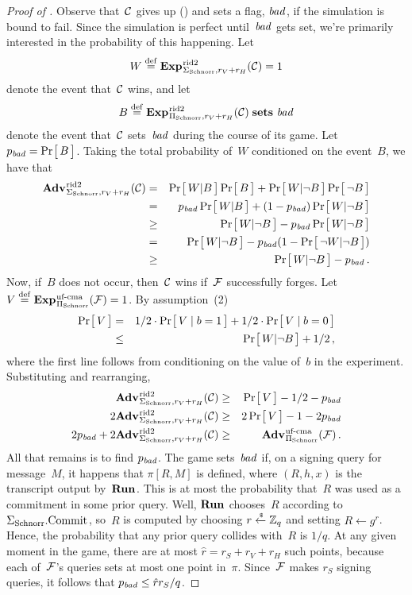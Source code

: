 \documentclass{article}
\theoremstyle{remark}
\begin{document}
\begin{proof}[Proof of ]
  Observe that~$\mathcal{C}$ gives up () and sets a flag, $\mathit{bad}$, if the
  simulation is bound to fail. Since the simulation is perfect until~$\mathit{bad}$ gets
  set, we're primarily interested in the probability of this happening.
  Let
  \[
    W \bydef \Exp{r\id2}_{\Schnorr,r_V+r_H}(\C) = 1
  \]
  denote the event that~$\mathcal{C}$ wins, and let
  \[
    B \bydef \Exp{r\id2}_{\SSchnorr,r_V+r_H}(\C)\sets \bad
  \]
  denote the event that~$\mathcal{C}$ sets~$\mathit{bad}$ during the course of its game. Let
  $p_{\mathit{bad}} = \Pr\hspace{-1pt}\big[\,B\,\big]$.
  Taking the total probability of~$W$ conditioned on the event~$B$, we have that
  \begin{eqnarray}
    \Adv{r\id2}_{\Schnorr,r_V+r_H}(\C) &=&
      \Prob{W | B}\Prob{B} + \Prob{W | \bnot B}\Prob{\bnot B} \\
    &=&
      p_\bad \Prob{W | B} + (1-p_\bad) \Prob{W | \bnot B} \\
    &\geq&
      \Prob{W | \bnot B} - p_\bad \Prob{W | \bnot B} \\
    &=&
      \Prob{W | \bnot B} - p_\bad (1 - \Prob{\bnot W | \bnot B}) \\
    &\geq&
      \Prob{W | \bnot B} - p_\bad\,.
  \end{eqnarray}
  Now, if~$B$ does not occur, then~$\mathcal{C}$ wins if~$\mathcal{F}$ successfully forges.
  Let
  $
     V \bydef \Exp{\ufcma}_{\SSchnorr}(\F)=1
  $.
  By assumption~(2)
  \begin{eqnarray}
    \Pr\hspace{-1pt}\big[\,V\,\big] &=&
      1/2 \cdot \Pr\hspace{-1pt}\big[\,V \mid b=1\,\big] +
      1/2 \cdot \Pr\hspace{-1pt}\big[\,V \mid b=0\,\big] \\
    &\leq&
      \Pr\hspace{-1pt}\big[\,W | \neg B\,\big] + 1/2 \,,
  \end{eqnarray}
  where the first line follows from conditioning on the value of~$b$ in the
  \ufcma experiment.
  Substituting and rearranging,
  \begin{eqnarray}
    \Adv{r\id2}_{\Schnorr,r_V+r_H}(\C) &\geq&
      \Prob{V} - 1/2 - p_\bad \\
    2\Adv{r\id2}_{\Schnorr,r_V+r_H}(\C) &\geq&
      2\Prob{V} - 1 - 2p_\bad \\
    2p_\bad + 2\Adv{r\id2}_{\Schnorr,r_V+r_H}(\C) &\geq&
      \Adv{\ufcma}_{\SSchnorr}(\F) \,.
  \end{eqnarray}
  All that remains is to find $p_{\mathit{bad}}$. The game sets~$\mathit{bad}$ if, on a signing
  query for message~$M$, it happens that $\pi[R,M]$ is defined, where $(R,h,x)$
  is the transcript output by~$\textup{\textbf{Run}}\hspace{0.5pt}$. This is at most the probability that~$R$
  was used as a commitment in some prior query. Well, $\textup{\textbf{Run}}\hspace{0.5pt}$ chooses~$R$
  according to ${\Sigma_{\mathrm{Schnorr}}}.\textnormal{Commit}\hspace{0.33pt}$, so~$R$ is computed by choosing $r\xleftarrow{\text{\tiny{\$}}}\mathbb{Z}_q$
  and setting $R\gets g^r$. Hence, the probability that any prior query
  collides with~$R$ is $1/q$. At any given moment in the game, there are at most
  $\hat{r} = r_S + r_V + r_H$ such points, because each of~$\mathcal{F}$'s queries sets
  at most one point in~$\pi$.  Since~$\mathcal{F}$ makes $r_S$ signing queries, it
  follows that $p_{\mathit{bad}} \leq \hat{r}r_S /q$.
\end{proof}
\end{document}
